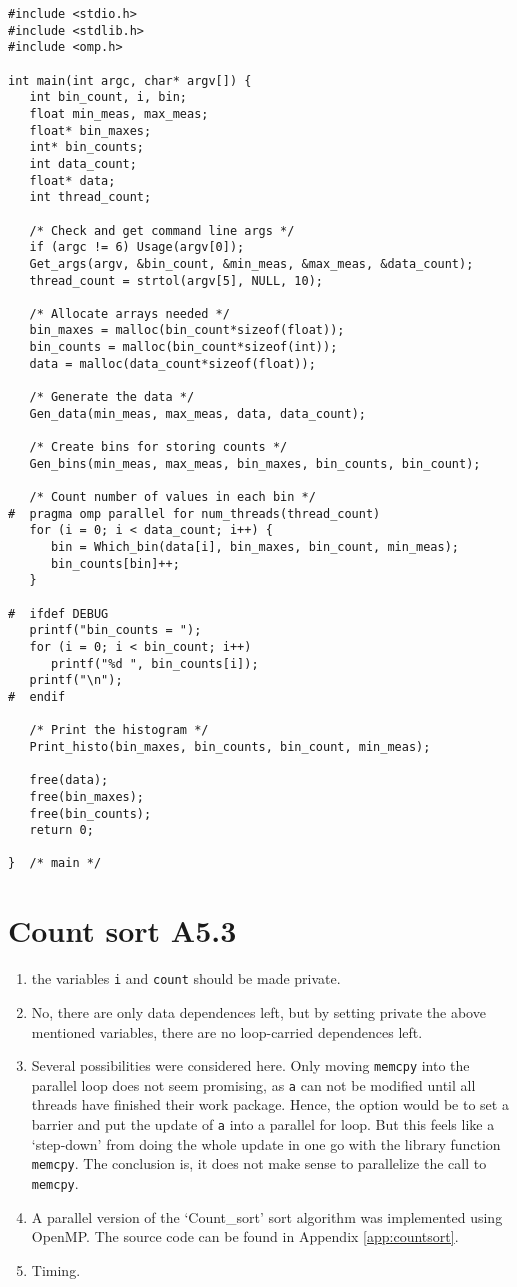 \documentclass[a4paper,11pt,twoside]{article}
\begin{document}
\begin{verbatim}
#include <stdio.h>
#include <stdlib.h>
#include <omp.h>

int main(int argc, char* argv[]) {
   int bin_count, i, bin;
   float min_meas, max_meas;
   float* bin_maxes;
   int* bin_counts;
   int data_count;
   float* data;
   int thread_count;

   /* Check and get command line args */
   if (argc != 6) Usage(argv[0]); 
   Get_args(argv, &bin_count, &min_meas, &max_meas, &data_count);
   thread_count = strtol(argv[5], NULL, 10);

   /* Allocate arrays needed */
   bin_maxes = malloc(bin_count*sizeof(float));
   bin_counts = malloc(bin_count*sizeof(int));
   data = malloc(data_count*sizeof(float));

   /* Generate the data */
   Gen_data(min_meas, max_meas, data, data_count);

   /* Create bins for storing counts */
   Gen_bins(min_meas, max_meas, bin_maxes, bin_counts, bin_count);

   /* Count number of values in each bin */
#  pragma omp parallel for num_threads(thread_count)
   for (i = 0; i < data_count; i++) {
      bin = Which_bin(data[i], bin_maxes, bin_count, min_meas);
      bin_counts[bin]++;
   }

#  ifdef DEBUG
   printf("bin_counts = ");
   for (i = 0; i < bin_count; i++)
      printf("%d ", bin_counts[i]);
   printf("\n");
#  endif

   /* Print the histogram */
   Print_histo(bin_maxes, bin_counts, bin_count, min_meas);

   free(data);
   free(bin_maxes);
   free(bin_counts);
   return 0;

}  /* main */
\end{verbatim}

\section{Count sort A5.3}
\begin{enumerate}[label={\alph*)}]
\item the variables \verb+i+ and \verb+count+ should be made private.
\item No, there are only data dependences left, but by setting private the above mentioned variables, there are no loop-carried dependences left. 
\item Several possibilities were considered here. Only moving \verb+memcpy+ into the parallel loop does not seem promising, as \verb+a+ can not be modified until all threads have finished their work package. Hence, the option would be to set a barrier and put the update of \verb+a+ into a parallel for loop. But this feels like a `step-down' from doing the whole update in one go with the library function \verb+memcpy+. The conclusion is, it does not make sense to parallelize the call to \verb+memcpy+.
\item A parallel version of the `Count\_sort' sort algorithm was implemented using OpenMP. The source code can be found in Appendix \ref{app:countsort}.
\item Timing.
\end{enumerate}
\end{document}
